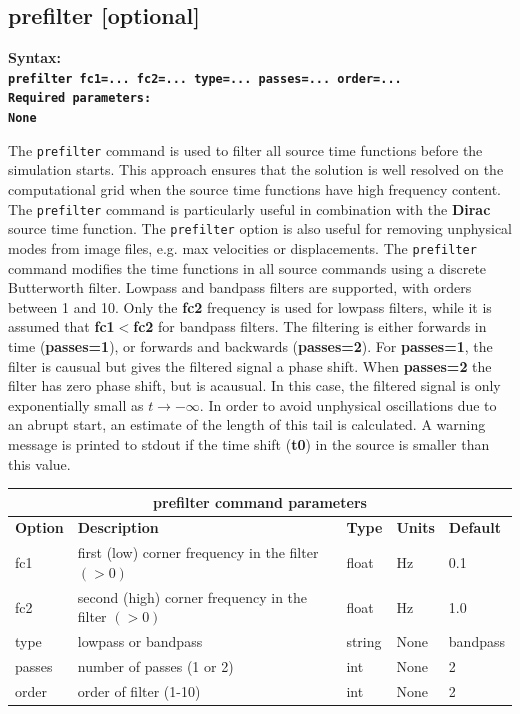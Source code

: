 \documentclass[11pt]{report}
\begin{document}
\subsection{prefilter [optional]}\label{keyword:prefilter}
\begin{flushleft}
\bf
Syntax:\\
\tt prefilter fc1=... fc2=... type=... passes=... order=...\\
\bf 
Required parameters:\\
\rm 
None
\end{flushleft}
The \verb+prefilter+ command is used to filter all source time functions before the simulation
starts. This approach ensures that the solution is well resolved on the computational grid when the
source time functions have high frequency content. The \verb+prefilter+ command is particularly
useful in combination with the {\bf Dirac} source time function. The \verb+prefilter+ option is also
useful for removing unphysical modes from image files, e.g. max velocities or displacements.  The
\verb+prefilter+ command modifies the time functions in all source commands using a discrete
Butterworth filter.  Lowpass and bandpass filters are supported, with orders between 1 and 10. Only
the {\bf fc2} frequency is used for lowpass filters, while it is assumed that {\bf fc1}$<${\bf fc2}
for bandpass filters. The filtering is either forwards in time ({\bf passes=1}), or forwards and
backwards ({\bf passes=2}). For {\bf passes=1}, the filter is causual but gives the filtered signal
a phase shift. When {\bf passes=2} the filter has zero phase shift, but is acausual. In this case,
the filtered signal is only exponentially small as $t\to-\infty$. In order to avoid unphysical
oscillations due to an abrupt start, an estimate of the length of this tail is calculated. A
warning message is printed to stdout if the time shift ({\bf t0}) in the source  is smaller than this value.
\begin{center}
\begin{tabular}{|l|p{8cm}|l|l|l|} \hline
\multicolumn{5}{|c|}{\bf prefilter command parameters}\\ \hline
\bf{Option} & \bf{Description} & \bf{Type} & \bf{Units} & \bf{Default} \\ 
\hline \hline
fc1 & first (low) corner frequency in the filter $(>0)$   & float  & Hz & 0.1 \\ \hline
fc2 & second (high) corner frequency in the filter $(>0)$ & float  & Hz & 1.0 \\ \hline
type & lowpass or bandpass                                & string & None & bandpass \\ \hline
passes & number of passes (1 or 2) & int & None & 2 \\ \hline
order  & order of filter (1-10) & int & None & 2 \\ \hline
\end{tabular}
\end{center}
\end{document}

